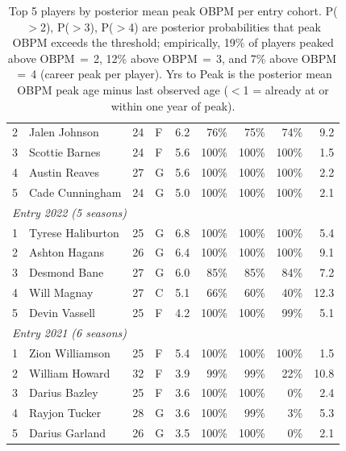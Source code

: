 \begin{table}[htbp]
\begin{tabular}{rlrlrrrrr}
    2 & Jalen Johnson & 24 & F & 6.2 & 76\% & 75\% & 74\% & 9.2 \\
    3 & Scottie Barnes & 24 & F & 5.6 & 100\% & 100\% & 100\% & 1.5 \\
    4 & Austin Reaves & 27 & G & 5.6 & 100\% & 100\% & 100\% & 2.2 \\
    5 & Cade Cunningham & 24 & G & 5.0 & 100\% & 100\% & 100\% & 2.1 \\
    \midrule[0.4pt]
    \multicolumn{9}{l}{\textit{Entry 2022 (5 seasons)}} \\
    \midrule
    1 & Tyrese Haliburton & 25 & G & 6.8 & 100\% & 100\% & 100\% & 5.4 \\
    2 & Ashton Hagans & 26 & G & 6.4 & 100\% & 100\% & 100\% & 9.1 \\
    3 & Desmond Bane & 27 & G & 6.0 & 85\% & 85\% & 84\% & 7.2 \\
    4 & Will Magnay & 27 & C & 5.1 & 66\% & 60\% & 40\% & 12.3 \\
    5 & Devin Vassell & 25 & F & 4.2 & 100\% & 100\% & 99\% & 5.1 \\
    \midrule[0.4pt]
    \multicolumn{9}{l}{\textit{Entry 2021 (6 seasons)}} \\
    \midrule
    1 & Zion Williamson & 25 & F & 5.4 & 100\% & 100\% & 100\% & 1.5 \\
    2 & William Howard & 32 & F & 3.9 & 99\% & 99\% & 22\% & 10.8 \\
    3 & Darius Bazley & 25 & F & 3.6 & 100\% & 100\% & 0\% & 2.4 \\
    4 & Rayjon Tucker & 28 & G & 3.6 & 100\% & 99\% & 3\% & 5.3 \\
    5 & Darius Garland & 26 & G & 3.5 & 100\% & 100\% & 0\% & 2.1 \\
    \bottomrule
  \end{tabular}
  \caption{Top 5 players by posterior mean peak OBPM per entry cohort. P($>$2), P($>$3), P($>$4) are posterior probabilities that peak OBPM exceeds the threshold; empirically, 19\% of players peaked above OBPM\,$=$\,2, 12\% above OBPM\,$=$\,3, and 7\% above OBPM\,$=$\,4 (career peak per player). Yrs to Peak is the posterior mean OBPM peak age minus last observed age ($<$1 = already at or within one year of peak).}
  \label{tab:breakout_cohort}
\end{table}

